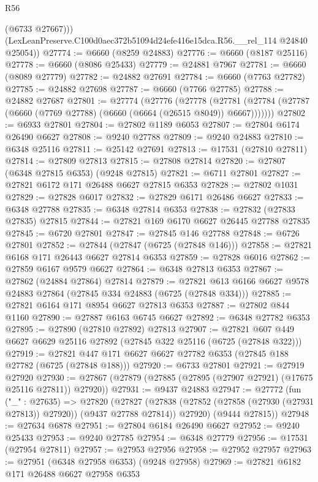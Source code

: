 \begin{lexlean}{R56}
\begin{coremodule}
          (@6733 @27667)))
      (LexLeanPreserve.C100d0aec372b51094d24efe416e15dca.R56.__rel_114 @24840 @25054))
@27774 := @6660 (@8259 @24883)
@27776 := @6660 (@8187 @25116)
@27778 := @6660 (@8086 @25433)
@27779 := @24881 @7967
@27781 := @6660 (@8089 @27779)
@27782 := @24882 @27691
@27784 := @6660 (@7763 @27782)
@27785 := @24882 @27698
@27787 := @6660 (@7766 @27785)
@27788 := @24882 @27687
@27801 := @27774
    (@27776
      (@27778
        (@27781 (@27784 (@27787 (@6660 (@7769 @27788) (@6660 (@6664 (@26515 @8049)) @6667)))))))
@27802 := @6933 @27801
@27804 := @27802 @1189 @6053
@27807 := @27804 @6174 @26490 @6627
@27808 := @9240 @27788
@27809 := @9240 @24883
@27810 := @6348 @25116
@27811 := @25142 @27691
@27813 := @17531 (@27810 @27811)
@27814 := @27809 @27813
@27815 := @27808 @27814
@27820 := @27807 (@6348 @27815 @6353) (@9248 @27815)
@27821 := @6711 @27801
@27827 := @27821 @6172 @171 @26488 @6627 @27815 @6353
@27828 := @27802 @1031
@27829 := @27828 @6017
@27832 := @27829 @6171 @26486 @6627
@27833 := @6348 @27788
@27835 := @6348 @27814 @6353
@27838 := @27832 (@27833 @27835) @27815
@27844 := @27821 @169 @6170 @6627 @26445 @27788 @27835
@27845 := @6720 @27801
@27847 := @27845 @146 @27788
@27848 := @6726 @27801
@27852 := @27844 (@27847 (@6725 (@27848 @146)))
@27858 := @27821 @6168 @171 @26443 @6627 @27814 @6353
@27859 := @27828 @6016
@27862 := @27859 @6167 @9579 @6627
@27864 := @6348 @27813 @6353
@27867 := @27862 (@24884 @27864) @27814
@27879 := @27821 @613 @6166 @6627 @9578 @24883 @27864 (@27845 @334 @24883 (@6725 (@27848 @334)))
@27885 := @27821 @6164 @171 @8954 @6627 @27813 @6353
@27887 := @27802 @844 @1160
@27890 := @27887 @6163 @6745 @6627
@27892 := @6348 @27782 @6353
@27895 := @27890 (@27810 @27892) @27813
@27907 := @27821 @607 @449 @6627 @6629 @25116 @27892 (@27845 @322 @25116 (@6725 (@27848 @322)))
@27919 := @27821 @447 @171 @6627 @6627 @27782 @6353 (@27845 @188 @27782 (@6725 (@27848 @188)))
@27920 := @6733 @27801
@27921 := @27919 @27920
@27930 := @27867 (@27879 (@27885 (@27895 (@27907 @27921) (@17675 @25116 @27811)) @27920))
@27931 := @9437 @24883
@27947 := @27772
    (fun ("_" : @27635) =>
    @27820
      (@27827
        (@27838 (@27852 (@27858 (@27930 (@27931 @27813)) @27920)) (@9437 @27788 @27814))
        @27920)
      (@9444 @27815))
@27948 := @27634 @6878
@27951 := @27804 @6184 @26490 @6627
@27952 := @9240 @25433
@27953 := @9240 @27785
@27954 := @6348 @27779
@27956 := @17531 (@27954 @27811)
@27957 := @27953 @27956
@27958 := @27952 @27957
@27963 := @27951 (@6348 @27958 @6353) (@9248 @27958)
@27969 := @27821 @6182 @171 @26488 @6627 @27958 @6353

\end{coremodule}
\end{lexlean}
